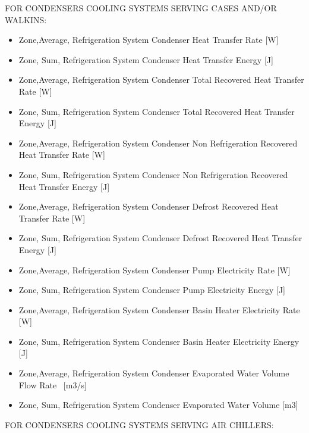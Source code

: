 FOR CONDENSERS COOLING SYSTEMS SERVING CASES AND/OR WALKINS:

\begin{itemize}
\item
  Zone,Average, Refrigeration System Condenser Heat Transfer Rate {[}W{]}
\item
  Zone, Sum, Refrigeration System Condenser Heat Transfer Energy {[}J{]}
\item
  Zone,Average, Refrigeration System Condenser Total Recovered Heat Transfer Rate {[}W{]}
\item
  Zone, Sum, Refrigeration System Condenser Total Recovered Heat Transfer Energy {[}J{]}
\item
  Zone,Average, Refrigeration System Condenser Non Refrigeration Recovered Heat Transfer Rate {[}W{]}
\item
  Zone, Sum, Refrigeration System Condenser Non Refrigeration Recovered Heat Transfer Energy {[}J{]}
\item
  Zone,Average, Refrigeration System Condenser Defrost Recovered Heat Transfer Rate {[}W{]}
\item
  Zone, Sum, Refrigeration System Condenser Defrost Recovered Heat Transfer Energy {[}J{]}
\item
  Zone,Average, Refrigeration System Condenser Pump Electricity Rate {[}W{]}
\item
  Zone, Sum, Refrigeration System Condenser Pump Electricity Energy {[}J{]}
\item
  Zone,Average, Refrigeration System Condenser Basin Heater Electricity Rate {[}W{]}
\item
  Zone, Sum, Refrigeration System Condenser Basin Heater Electricity Energy {[}J{]}
\item
  Zone,Average, Refrigeration System Condenser Evaporated Water Volume Flow Rate~ {[}m3/s{]}
\item
  Zone, Sum, Refrigeration System Condenser Evaporated Water Volume {[}m3{]}
\end{itemize}

FOR CONDENSERS COOLING SYSTEMS SERVING AIR CHILLERS:

